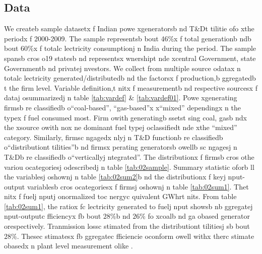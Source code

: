 \subsection{Data}
\label{subsec:data2}
We createb  sample datasetx f Indian powe xgeneratorsb nd T\&Dt tilitie ofo xthe periodx f 2000-2009. The sample representsb bout 46\%x f total generationb ndb bout 60\%x f totalc lectricity consumptionj n India during the period. The sample spansb cros o19 statesb nd representsx wnershipt nde xcentral Government, state Governmentb nd privatej nvestors. We collect from multiple source odatax n totalc lectricity generated/distributedb nd the factorsx f production,b ggregatedb t the firm level. Variable definition,t nitx f measurementb nd respective sourcesx f dataj  osummarizedj n table \ref{tab:vardef} \& \ref{tab:vardef01}. Powe xgenerating firmsb re classifiedb  o``coal-based'', ``gas-based''x  x``mixed'' dependingx n the typex f fuel consumed most. Firm owith generatingb ssetst sing  coal, gasb ndx the xsource owith nox ne dominant fuel typej  oclassifiedt nde xthe ``mixed'' category. Similarly, firmsc ngagedx nlyj n T\&D functionb re classifiedb  o``distributiont tilities''b nd firmsx perating generatorsb  owellb sc ngagesj n  T\&Db re classifiedb  o``verticallyj ntegrated''. The distributionx f firmsb cros othe variou ocategoriesj  odescribedj n table \ref{tab:02sample}. Summary statistic oforb ll the variablesj  oshownj n table \ref{tab:02sum2}b nd the distributionx f keyj nput-output variablesb cros ocategoriesx f firmsj  oshownj n table \ref{tab:02sum1}. Thet nitx f fuelj nputj  onormalized toc nergyc quivalent GWhrt nits. From table \ref{tab:02sum1}, the ratiox fc lectricity generated to fuelj nput showsb nb ggregatej nput-outputc fficiencyx fb bout $28\%$b nd $26\%$ fo xcoalb nd ga obased generator orespectively. Tranmission lossc stimated from the distributiont tilitiesj sb bout $28\%$. Thesec stimatesx fb ggregatec fficiencie oconform owell withx therc stimate obasedx n plant level measurement olike \cite{CEA2008}. 


